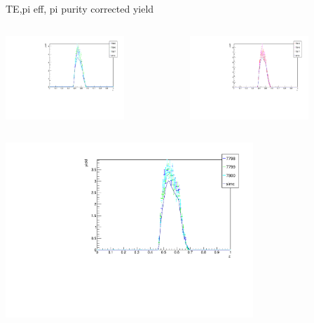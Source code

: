 \begin{frame}{TE,pi eff, pi purity corrected yield}
\begin{columns}
\begin{column}[T]{0.5\textwidth}
\includegraphics[width = 0.7\textwidth]{results/yield/check/yieldcheck_550_neg.pdf}
\end{column}
\begin{column}[T]{0.5\textwidth}
\includegraphics[width = 0.7\textwidth]{results/yield/check/yieldcheck_550_pos.pdf}
\end{column}
\end{columns}
\begin{columns}
\begin{column}[T]{0.5\textwidth}
\includegraphics[width = 0.7\textwidth]{results/yield/check/yieldcheck_540_neg.pdf}

\end{column}
\end{columns}
\end{frame}
